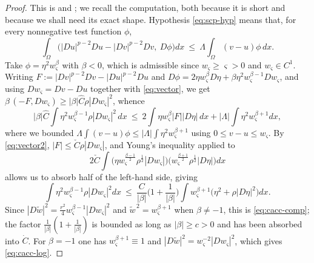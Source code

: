 \documentclass[reqno]{amsart}
\theoremstyle{plain}
\theoremstyle{definition}
\theoremstyle{remark}
\begin{document}
\begin{proof}
This is \cite[(A.1)--(A.9)]{DS2} and \cite[(3.4)--(3.15)]{MMS}; we recall the computation, both
because it is short and because we shall need its exact shape. Hypothesis \eqref{eq:scp-hyp} means
that, for every nonnegative test function $\phi$,
\[
\int_\Omega\big(|Du|^{p-2}Du-|Dv|^{p-2}Dv,\ D\phi\big)dx\ \le\ \Lambda\int_\Omega(v-u)\phi\,dx .
\]
Take $\phi=\eta^2w_\varsigma^{\beta}$ with $\beta<0$, which is admissible since
$w_\varsigma\ge\varsigma>0$ and $w_\varsigma\in C^1$. Writing
$F:=|Dv|^{p-2}Dv-|Du|^{p-2}Du$ and
$D\phi=2\eta w_\varsigma^{\beta}D\eta+\beta\eta^2w_\varsigma^{\beta-1}Dw_\varsigma$, and using
$Dw_\varsigma=Dv-Du$ together with \eqref{eq:vector}, we get
$\beta\,(-F,Dw_\varsigma)\ge|\beta|\hat C\rho|Dw_\varsigma|^2$, whence
\[
|\beta|\hat C\int\eta^2w_\varsigma^{\beta-1}\rho|Dw_\varsigma|^2\,dx
\ \le\ 2\int\eta w_\varsigma^{\beta}|F||D\eta|\,dx+|\Lambda|\int\eta^2w_\varsigma^{\beta+1}dx ,
\]
where we bounded $\Lambda\int(v-u)\phi\le|\Lambda|\int\eta^2w_\varsigma^{\beta+1}$ using
$0\le v-u\le w_\varsigma$. By \eqref{eq:vector2}, $|F|\le\check C\rho|Dw_\varsigma|$, and Young's
inequality applied to
\[
2\check C\int\big(\eta w_\varsigma^{\frac{\beta-1}{2}}\rho^{\frac12}|Dw_\varsigma|\big)
\big(w_\varsigma^{\frac{\beta+1}{2}}\rho^{\frac12}|D\eta|\big)dx
\]
allows us to absorb half of the left-hand side, giving
\[
\int\eta^2w_\varsigma^{\beta-1}\rho|Dw_\varsigma|^2dx\ \le\
\frac{C}{|\beta|}\Big(1+\frac1{|\beta|}\Big)\int w_\varsigma^{\beta+1}\big(\eta^2+\rho|D\eta|^2\big)dx .
\]
Since $|D\widetilde w|^2=\frac{r^2}{4}w_\varsigma^{\beta-1}|Dw_\varsigma|^2$ and
$\widetilde w^{\,2}=w_\varsigma^{\beta+1}$ when $\beta\ne-1$, this is \eqref{eq:cacc-comp}; the
factor $\frac{1}{|\beta|}(1+\frac1{|\beta|})$ is bounded as long as $|\beta|\ge c>0$ and has been
absorbed into $\dot C$. For $\beta=-1$ one has $w_\varsigma^{\beta+1}\equiv1$ and
$|D\widetilde w|^2=w_\varsigma^{-2}|Dw_\varsigma|^2$, which gives \eqref{eq:cacc-log}.
\end{proof}
\end{document}
